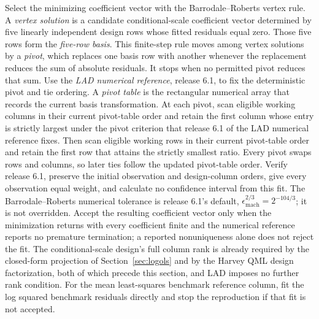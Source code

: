 \documentclass[11pt]{article}
\begin{document}
Select the minimizing coefficient vector with the Barrodale--Roberts vertex rule. A
\emph{vertex solution} is a candidate conditional-scale coefficient vector determined by five linearly independent
design rows whose fitted residuals equal zero. Those five rows form the
\emph{five-row basis}. This finite-step rule moves among vertex solutions by a
\emph{pivot}, which replaces one basis row with another whenever the replacement reduces
the sum of absolute residuals. It stops when no permitted pivot reduces that sum. Use the
\emph{LAD numerical reference}, release 6.1, to fix the deterministic pivot and tie ordering. A
\emph{pivot table} is the rectangular numerical array that records the current basis
transformation. At each pivot, scan eligible working columns in their current pivot-table order and
retain the first column whose entry is strictly largest under the pivot criterion that release 6.1 of
the LAD numerical reference fixes. Then scan eligible
working rows in their current pivot-table order and retain the first row that attains the strictly
smallest ratio. Every pivot swaps rows and columns, so later ties follow the updated pivot-table
order. Verify release 6.1, preserve the initial observation and design-column orders, give every
observation equal weight, and calculate no confidence interval from this fit. The
Barrodale--Roberts numerical tolerance is release 6.1's default,
\(\epsilon_{\mathrm{mach}}^{2/3}=2^{-104/3}\); it is not overridden. Accept the resulting coefficient
vector only when the minimization returns with every coefficient finite and the numerical reference
reports no premature termination; a reported nonuniqueness alone does not reject the fit. The
conditional-scale design's full column rank is already required by the closed-form projection of
Section~\ref{sec:logols} and by the Harvey QML design factorization, both of which precede this
section, and LAD imposes no further rank condition. For the mean least-squares benchmark reference
column, fit the log squared benchmark residuals directly and stop the reproduction if that fit is
not accepted.
\end{document}
